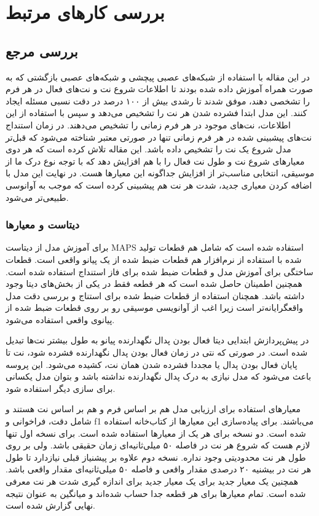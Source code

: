 \chapter{بررسی کارهای مرتبط}
\section{بررسی مرجع \cite{hawthorne2017onsets}}
در این مقاله با استفاده از شبکه‌های عصبی پیچشی و شبکه‌های عصبی بازگشتی که به صورت
همراه آموزش داده شده بودند تا اطلاعات شروع نت و نت‌های فعال در هر فرم را تشخصی
دهند، موفق شدند تا رشدی بیش از ۱۰۰ درصد در دقت نسبی مسئله ایجاد کنند. این مدل
ابتدا فشرده شدن هر نت را تشخیص می‌دهد و سپس با استفاده از این اطلاعات، نت‌های
موجود در هر فرم زمانی را تشخیص می‌دهند. در زمان استنداج نت‌های پیشبینی شده در هر
فرم زمانی تنها در صورتی معتبر شناخته می‌شود که قبل‌تر مدل شروع یک نت را تشخیص
داده باشد. این مقاله تلاش کرده است که هر دوی معیارهای شروع نت و طول نت فعال را
با هم افزایش دهد که با توجه نوع درک ما از موسیقی، انتخابی مناسب‌تر از افزایش
جداگونه این معیارها هست. در نهایت این مدل با اضافه کردن معیاری جدید، شدت هر نت
هم پیشبینی کرده است که موجب به آوانوسی طبیعی‌تر می‌شود.

\subsection{دیتاست و معیارها}
برای آموزش مدل از دیتاست
MAPS
استفاده شده است که شامل هم قطعات تولید شده با استفاده از نرم‌افزار هم قطعات ضبط
شده از یک پیانو واقعی است. قطعات ساختگی برای آموزش مدل و قطعات ضبط شده برای فاز
استنداج استفاده شده است. همچنین اطمینان حاصل شده است که هر قطعه فقط در یکی از
بخش‌های دیتا وجود داشته باشد. همچنان استفاده از قطعات ضبط شده برای استناج و بررسی
دقت مدل واقعگرایانه‌تر است زیرا اغب از آوانویسی موسیقی رو بر روی قطعات ضبط شده
از پیانوی واقعی استفاده می‌شود.

در پیش‌پردازش ابتدایی دیتا فعال بودن پدال نگهدارنده پیانو به طول بیشتر نت‌ها
تبدیل شده است. در صورتی که نتی در زمان فعال بودن پدال نگهدارنده فشرده شود، نت
تا پایان فعال بودن پدال یا مجددا فشرده شدن همان نت، کشیده می‌شود. این پروسه
باعث می‌شود که مدل نیازی به درک پدال نگهدارنده نداشته باشد و بتوان مدل یکسانی
برای سازی دیگر استفاده شود.

معیارهای استفاده برای ارزیابی مدل هم بر اساس فرم و هم بر اساس نت هستند و شامل
دقت، فراخوانی و 
f1
می‌باشند. برای پیاده‌سازی این معیارها از کتاب‌خانه
 \cite{raffel2014mir_eval}
استفاده شده است. دو نسخه برای هر یک از معیارها استفاده شده است. برای نسخه اول
تنها لازم هست که شروع هر نت در فاصله ۵۰ میلی‌ثانیه‌ای زمان حقیقی باشد. ولی بر روی
طول هر نت محدودیتی وجود نداره. نسخه دوم علاوه بر پیشنیاز قبلی نیازدارد تا طول هر
نت در بیشنیه ۲۰ درصدی مقدار واقعی و فاصله ۵۰ میلی‌ثانیه‌ای مقدار واقعی باشد.
همچنین یک معیار جدید برای یک معیار جدید برای اندازه گیری شدت هر نت معرفی شده
است. تمام معیارها برای هر قطعه جدا حساب شده‌اند و میانگین به عنوان نتیجه نهایی
گزارش شده است.

